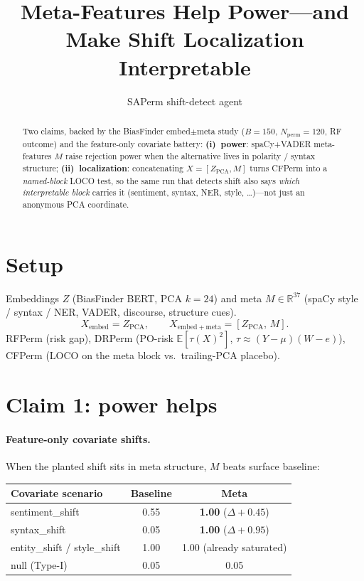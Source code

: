 \documentclass[11pt]{article}
\title{Meta-Features Help Power---and Make Shift Localization Interpretable}
\author{SAPerm shift-detect agent}
\date{}
\begin{document}
\maketitle

\begin{abstract}
\noindent
Two claims, backed by the BiasFinder embed$\pm$meta study
($B{=}150$, $N_{\mathrm{perm}}{=}120$, RF outcome) and the
feature-only covariate battery:
\textbf{(i)~power}: spaCy+VADER meta-features $M$ raise rejection power
when the alternative lives in polarity / syntax structure;
\textbf{(ii)~localization}: concatenating $X=[Z_{\mathrm{PCA}},M]$ turns
CFPerm into a \emph{named-block} LOCO test, so the same run that detects
shift also says \emph{which interpretable block} carries it
(sentiment, syntax, NER, style, \ldots)---not just an anonymous PCA
coordinate.
\end{abstract}

\section{Setup}
Embeddings $Z$ (BiasFinder BERT, PCA $k{=}24$) and meta $M\in\mathbb{R}^{37}$
(spaCy style / syntax / NER, VADER, discourse, structure cues).
\[
X_{\mathrm{embed}}=Z_{\mathrm{PCA}},\qquad
X_{\mathrm{embed+meta}}=[Z_{\mathrm{PCA}},\,M].
\]
RFPerm (risk gap), DRPerm (PO-risk
$\mathbb{E}[\tau(X)^2]$, $\tau\approx(Y-\mu)(W-e)$),
CFPerm (LOCO on the meta block vs.\ trailing-PCA placebo).

\section{Claim 1: power helps}
\paragraph{Feature-only covariate shifts.}
When the planted shift sits in meta structure, $M$ beats surface baseline:
\begin{center}
\begin{tabular}{lcc}
\toprule
Covariate scenario & Baseline & Meta \\
\midrule
sentiment\_shift & 0.55 & \textbf{1.00} ($\Delta{+}0.45$) \\
syntax\_shift & 0.05 & \textbf{1.00} ($\Delta{+}0.95$) \\
entity\_shift / style\_shift & 1.00 & 1.00 (already saturated) \\
null (Type-I) & 0.05 & 0.05 \\
\bottomrule
\end{tabular}
\end{center}
\end{document}
